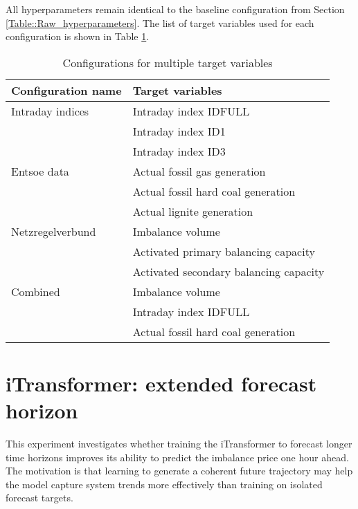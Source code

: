 \documentclass[class=scrbook, crop=false]{standalone}
\begin{document}
All hyperparameters remain identical to the baseline configuration from Section \ref{Table::Raw_hyperparameters}. The list of target variables used for each configuration is shown in Table \ref{Table::Multiple_Targets}.


  
  \begin{table}[]
\centering
\begin{tabular}{l|l}
 Configuration name & Target variables  \\\hline
 Intraday indices&   Intraday index IDFULL\\
 		& Intraday index ID1 \\
 		& Intraday index ID3 \\ \hline
 Entsoe data & Actual fossil gas generation  \\
 		& Actual fossil hard coal generation \\
 		& Actual lignite generation \\ \hline
 Netzregelverbund & Imbalance volume  \\
 		& Activated primary balancing capacity \\
 		& Activated secondary balancing capacity \\ \hline
 Combined & Imbalance volume   \\
 		& Intraday index IDFULL \\
 		& Actual fossil hard coal generation \\ 
\end{tabular}
\caption{Configurations for multiple target variables}
\label{Table::Multiple_Targets}
\end{table}

\section{iTransformer: extended forecast horizon}
This experiment investigates whether training the iTransformer to forecast longer time horizons improves its ability to predict the imbalance price one hour ahead. The motivation is that learning to generate a coherent future trajectory may help the model capture system trends more effectively than training on isolated forecast targets.
\end{document}
